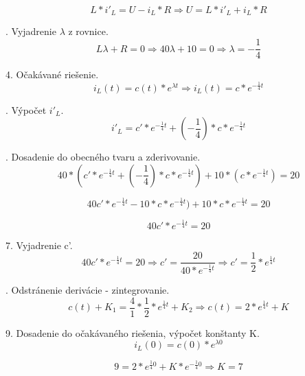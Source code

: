 \documentclass[a4paper,12pt]{article}
\begin{document}
\begin{equation}
L * i'_L =  U - i_L * R \Rightarrow   U = L * i'_L + i_L * R
\end{equation}

. Vyjadrenie $\lambda$ z rovnice.
\begin{equation}
L\lambda + R = 0 \Rightarrow 40\lambda + 10 = 0 \Rightarrow \lambda = -\frac{1}{4}
\end{equation}

4. Očakávané riešenie.
\begin{equation}
i_L(t) = c(t)*e^{\lambda t} \Rightarrow i_L(t) = c*e^{-\frac{1}{4} t}
\end{equation}

. Výpočet $i'_L$.
\begin{equation}
i'_L = c'*e^{-\frac{1}{4} t} + (-\frac{1}{4}) * c*e^{-\frac{1}{4} t}
\end{equation}

. Dosadenie do obecného tvaru a zderivovanie.
\begin{equation}
40*(c'*e^{-\frac{1}{4} t} + (-\frac{1}{4}) * c*e^{-\frac{1}{4} t}) + 10*(c*e^{-\frac{1}{4} t}) = 20
\end{equation}

\begin{equation}
40c'*e^{-\frac{1}{4} t} -10 * c*e^{-\frac{1}{4} t}) + 10*c*e^{-\frac{1}{4} t} = 20
\end{equation}

\begin{equation}
40c'*e^{-\frac{1}{4} t} = 20
\end{equation}

7. Vyjadrenie c'.
\begin{equation}
40c'*e^{-\frac{1}{4} t} = 20 \Rightarrow c' = \frac{20}{40*e^{-\frac{1}{4} t}} \Rightarrow c' = \frac{1}{2}*e^{\frac{1}{4} t}
\end{equation}

. Odstránenie derivácie - zintegrovanie.
\begin{equation}
c(t) + K_1 = \frac{4}{1} * \frac{1}{2}*e^{\frac{1}{4} t} + K_2 \Rightarrow c(t) = 2*e^{\frac{1}{4} t} + K
\end{equation}

9. Dosadenie do očakávaného riešenia, výpočet konštanty K.
\begin{equation}
i_L(0) = c(0) * e^{\lambda 0}
\end{equation}

\begin{equation}
9 =  2*e^{\frac{1}{4} 0} + K*e^{-\frac{1}{4} 0} \Rightarrow K = 7
\end{equation}
\end{document}
